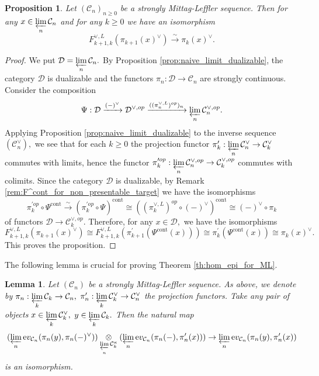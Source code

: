 \documentclass[11pt,leqno]{amsart}
\newtheorem{lemma}[theo]{Lemma}
\newtheorem{prop}[theo]{Proposition}
\numberwithin{equation}{section}
\newcommand{\tens}[1]{%
  \mathbin{\mathop{\otimes}\displaylimits_{#1}}%
}
\newcommand{\prolim}[1][]{\mathop{\varprojlim}\limits_{#1}}
\newcommand{\xto}{\xrightarrow}
\newcommand{\cont}{\operatorname{cont}}
\newcommand{\ev}{\mathrm ev}
\newcommand{\cD}{{\mathcal D}}
\newcommand{\cC}{{\mathcal C}}
\begin{document}
\begin{prop}\label{prop:dual_pointwise_ML}
Let $(\cC_n)_{n\geq 0}$ be a strongly Mittag-Leffler sequence. Then for any $x\in\prolim[n]\cC_n$ and for any $k\geq 0$ we have an isomorphism
$$F_{k+1,k}^{\vee,L}(\pi_{k+1}(x)^{\vee})\xto{\sim}\pi_k(x)^{\vee}.$$
\end{prop}

\begin{proof}We put $\cD=\prolim[n]\cC_n.$ By Proposition \ref{prop:naive_limit_dualizable}, the category $\cD$ is dualizable and the functors $\pi_n:\cD\to\cC_n$ are strongly continuous. Consider the composition
$$\Psi:\cD\xto{(-)^{\vee}}\cD^{\vee,op}\xto{((\pi_n^{\vee,L})^{op})_n}\prolim[n]\cC_n^{\vee,op}.$$ Applying Proposition \ref{prop:naive_limit_dualizable} to the inverse sequence $(\cC_n^{\vee}),$ we see that for each $k\geq 0$ the projection functor $\pi_k^\prime:\prolim[n]\cC_n^{\vee}\to\cC_k^{\vee}$ commutes with limits, hence the functor $\pi_k^{\prime op}:\prolim[n]\cC_n^{\vee,op}\to\cC_k^{\vee,op}$ commutes with colimits. Since the category $\cD$ is dualizable, by Remark \ref{rem:F^cont_for_non_presentable_target} we have the isomorphisms $$\pi_k^{\prime op}\circ \Psi^{\cont}\xto{\sim} (\pi_k^{\prime op}\circ \Psi)^{\cont}\cong ((\pi_k^{\vee,L})^{op}\circ (-)^{\vee})^{\cont}\cong (-)^{\vee}\circ \pi_k$$
of functors $\cD\to\cC_k^{\vee,op}.$ Therefore, for any $x\in\cD,$ we have the isomorphisms
$$F_{k+1,k}^{\vee,L}(\pi_{k+1}(x)^{\vee})\cong F_{k+1,k}^{\vee,L}(\pi_{k+1}^\prime(\Psi^{\cont}(x)))\cong \pi_k^\prime(\Psi^{\cont}(x))\cong \pi_k(x)^{\vee}.$$
This proves the proposition.\end{proof}

The following lemma is crucial for proving Theorem \ref{th:hom_epi_for_ML}.

\begin{lemma}\label{lem:key_lemma_ML} Let $(\cC_n)$ be a strongly Mittag-Leffler sequence. As above, we denote by $\pi_n:\prolim[k]\cC_k\to\cC_n,$ $\pi_n':\prolim[k]\cC_k^{\vee}\to\cC_n^{\vee}$ the projection functors. Take any pair of objects $x\in\prolim[k]\cC_k^{\vee},$ $y\in\prolim[k]\cC_k.$ Then the natural map
\begin{equation}\label{eq:tricky_tensor_product_for_ML}(\prolim[n]\ev_{\cC_n}(\pi_n(y),\pi_n(-)^{\vee}))\tens{\prolim[n]\cC_k^{\kappa}} (\prolim[n]\ev_{\cC_n}(\pi_n(-),\pi_n^\prime(x)))\to\prolim[n]\ev_{\cC_n}(\pi_n(y),\pi_n^\prime(x))\end{equation}
is an isomorphism.\end{lemma}
\end{document}
